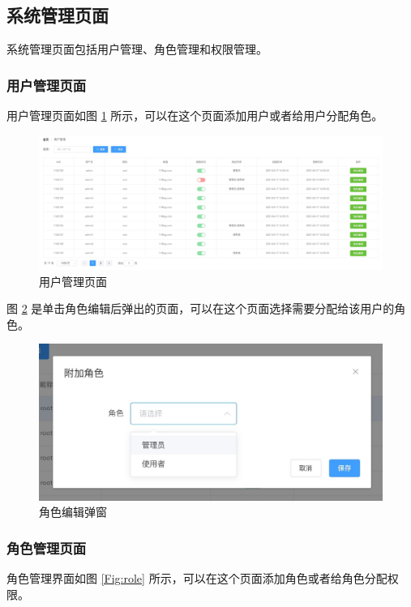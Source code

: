 \newpage
\subsection{系统管理页面}
系统管理页面包括用户管理、角色管理和权限管理。

\subsubsection{用户管理页面}
用户管理页面如图 \ref{Fig:user} 所示，可以在这个页面添加用户或者给用户分配角色。

\begin{figure}[ht]
    \centering
    \includegraphics[width=1\linewidth]{./Figure/IMG_user.png}
    \caption{用户管理页面}\label{Fig:user}
\end{figure}

图 \ref{Fig:add_role} 是单击角色编辑后弹出的页面，可以在这个页面选择需要分配给该用户的角色。

\begin{figure}[ht]
    \centering
    \includegraphics[width=1\linewidth]{./Figure/IMG_add_role.png}
    \caption{角色编辑弹窗}\label{Fig:add_role}
\end{figure}

\subsubsection{角色管理页面}
角色管理界面如图 \ref{Fig:role} 所示，可以在这个页面添加角色或者给角色分配权限。

